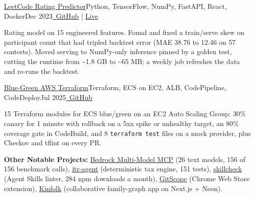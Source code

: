 \resumeExp
{\href{https://leetcode-rating-predictor.onrender.com/}{LeetCode Rating Predictor}}{Python, TensorFlow, NumPy, FastAPI, React, Docker}{Dec 2023}{\href{https://github.com/Sagargupta16/LeetCode_Rating_Predictor}{\faGithub\ GitHub} | \href{https://leetcode-rating-predictor.onrender.com/}{Live}}
\resumeItemListStart
    \item[$\diamond$] Rating model on 15 engineered features. Found and fixed a train/serve skew on participant count that had tripled backtest error (MAE 38.76 to 12.46 on 57 contests). Moved serving to NumPy-only inference pinned by a golden test, cutting the runtime from \textasciitilde1.8 GB to \textasciitilde65 MB; a weekly job refreshes the data and re-runs the backtest.
\resumeItemListEnd

\resumeExp
{\href{https://github.com/Sagargupta16/terraform-aws-ecs-blue-green}{Blue-Green AWS Terraform}}{Terraform, ECS on EC2, ALB, CodePipeline, CodeDeploy}{Jul 2025}{\href{https://github.com/Sagargupta16/terraform-aws-ecs-blue-green}{\faGithub\ GitHub}}
\resumeItemListStart
    \item[$\diamond$] 15 Terraform modules for ECS blue/green on an EC2 Auto Scaling Group: 30\% canary for 1 minute with rollback on a 5xx spike or unhealthy target, an 80\% coverage gate in CodeBuild, and 8 \texttt{terraform test} files on a mock provider, plus Checkov and tflint on every PR.
\resumeItemListEnd

\resumeSubHeadingListEnd
\vspace{-2pt}
\small{\textbf{Other Notable Projects:} \href{https://github.com/Sagargupta16/bedrock-multi-model-mcp}{Bedrock Multi-Model MCP} (26 text models, 156 of 156 benchmark calls), \href{https://github.com/Sagargupta16/itr-agent}{itr-agent} (deterministic tax engine, 151 tests), \href{https://github.com/Sagargupta16/skillcheck}{skillcheck} (Agent Skills linter, 284 npm downloads a month), \href{https://chromewebstore.google.com/detail/gitscope/fndaanihifimmlnmkjdmjbbkbdajolff}{GitScope} (Chrome Web Store extension), \href{https://kinfolk-neon.vercel.app/}{Kinfolk} (collaborative family-graph app on Next.js + Neon).}
\vspace{-2mm}
